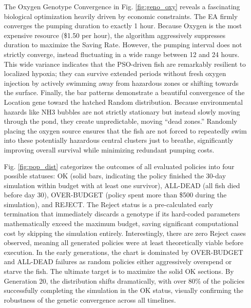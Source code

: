 \documentclass[conference]{IEEEtran}
\begin{document}
The Oxygen Genotype Convergence in Fig. \ref{fig:geno_oxy} reveals a fascinating biological optimization heavily driven by economic constraints. The EA firmly converges the pumping duration to exactly 1 hour. Because Oxygen is the most expensive resource (\$1.50 per hour), the algorithm aggressively suppresses duration to maximize the Saving Rate. However, the pumping interval does not strictly converge, instead fluctuating in a wide range between 12 and 24 hours. This wide variance indicates that the PSO-driven fish are remarkably resilient to localized hypoxia; they can survive extended periods without fresh oxygen injection by actively swimming away from hazardous zones or shifting towards the surface. Finally, the bar patterns demonstrate a beautiful convergence of the Location gene toward the hatched Random distribution. Because environmental hazards like NH3 bubbles are not strictly stationary but instead slowly moving through the pond, they create unpredictable, moving ``dead zones.'' Randomly placing the oxygen source ensures that the fish are not forced to repeatedly swim into these potentially hazardous central clusters just to breathe, significantly improving overall survival while minimizing redundant pumping costs.

Fig. \ref{fig:pop_dist} categorizes the outcomes of all evaluated policies into four possible statuses: OK (solid bars, indicating the policy finished the 30-day simulation within budget with at least one survivor), ALL-DEAD (all fish died before day 30), OVER-BUDGET (policy spent more than \$500 during the simulation), and REJECT. The Reject status is a pre-calculated early termination that immediately discards a genotype if its hard-coded parameters mathematically exceed the maximum budget, saving significant computational cost by skipping the simulation entirely. Interestingly, there are zero Reject cases observed, meaning all generated policies were at least theoretically viable before execution. In the early generations, the chart is dominated by OVER-BUDGET and ALL-DEAD failures as random policies either aggressively overspend or starve the fish. The ultimate target is to maximize the solid OK sections. By Generation 20, the distribution shifts dramatically, with over 80\% of the policies successfully completing the simulation in the OK status, visually confirming the robustness of the genetic convergence across all timelines.
\end{document}
